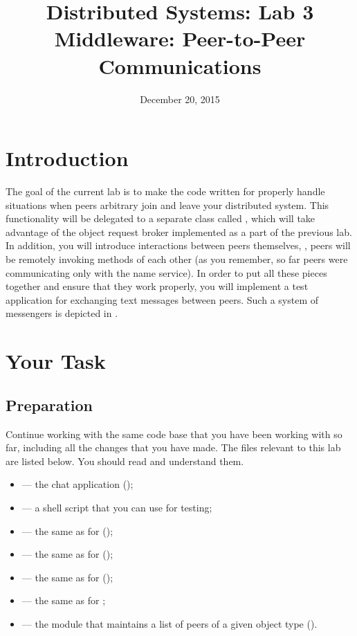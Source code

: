 \documentclass[a4paper]{article}
\title{Distributed Systems: Lab 3\\Middleware: Peer-to-Peer
Communications}
\author{}
\date{December 20, 2015}
\begin{document}
\maketitle

\section{Introduction}

The goal of the current lab is to make the code written for  properly
handle situations when peers arbitrary join and leave your distributed system.
This functionality will be delegated to a separate class called
, which will take advantage of the object request broker
implemented as a part of the previous lab. In addition, you will introduce
interactions between peers themselves, \ie, peers will be remotely invoking
methods \cite{lecture3} of each other (as you remember, so far peers were
communicating only with the name service). In order to put all these pieces
together and ensure that they work properly, you will implement a test
application for exchanging text messages between peers. Such a system of
messengers is depicted in .

\section{Your Task}
\subsection{Preparation}
Continue working with the same code base that you have been working with so far,
including all the changes that you have made. The files relevant to this lab are
listed below. You should read and understand them.
\begin{itemize}

  \item {} --- the chat application (\leave);

  \item {} --- a shell script that you can use for testing;

  \item {} --- the same as for
   (\leave);

  \item {} --- the same as for 
  (\overwrite);

  \item {} --- the same as for 
  (\overwrite);

  \item {} --- the same as for ;

  \item {} --- the module that maintains a
  list of peers of a given object type (\fix).

\end{itemize}
\end{document}
